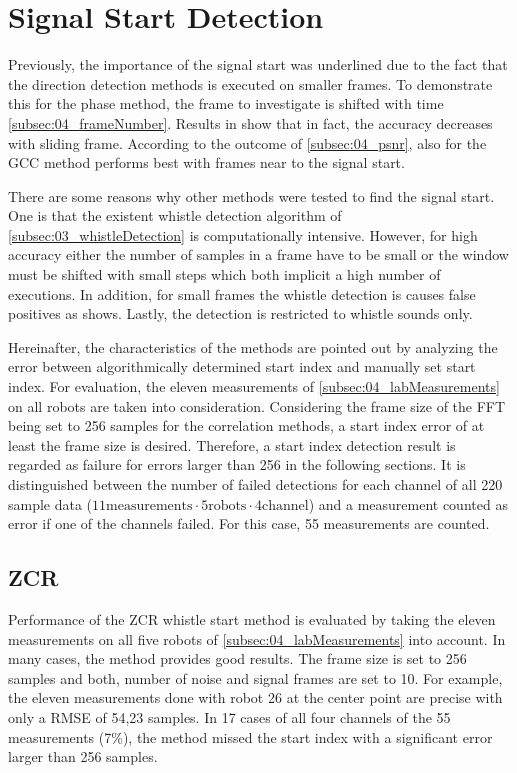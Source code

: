 \section{Signal Start Detection}
\label{sec:04_signalStartDetection}

Previously, the importance of the signal start was underlined
due to the fact that the direction detection methods is
executed on smaller frames.
To demonstrate this for the phase method, the frame to investigate is
shifted with time \cref{subsec:04_frameNumber}.
Results in show that in fact, the accuracy decreases with sliding frame.
According to the outcome of \cref{subsec:04_psnr}, also for the \ac{GCC}
method performs best with frames near to the signal start.

There are some reasons why other methods were tested to find the signal start.
One is that the existent whistle detection algorithm of \cref{subsec:03_whistleDetection}
is computationally intensive.
However, for high accuracy either the number of samples in a frame have to be
small or the window must be shifted with small steps which both implicit
a high number of executions.
In addition, for small frames the whistle detection is causes false positives
as \label{subsec:04_whistleDetection} shows.
Lastly, the detection is restricted to whistle sounds only.

Hereinafter, the characteristics of the methods are pointed out by
analyzing the error between algorithmically determined start index
and manually set start index.
For evaluation, the eleven measurements of \cref{subsec:04_labMeasurements}
on all robots are taken into consideration.
Considering the frame size of the \ac{FFT} being set to 256 samples for the
correlation methods, a start index error of at least the frame size is
desired.
Therefore, a start index detection result is regarded as failure for errors
larger than 256 in the following sections.
It is distinguished between the number of failed detections for each channel of
all 220 sample data ($11 \text{measurements} \cdot 5 \text{robots} \cdot 4 \text{channel}$)
and a measurement counted as error if one of the channels failed.
For this case, 55 measurements are counted.

\subsection{ZCR}
\label{subsec:04_zcr}

Performance of the \ac{ZCR} whistle start method is evaluated by taking the eleven
measurements on all five robots of \cref{subsec:04_labMeasurements} into account.
In many cases, the method provides good results.
The frame size is set to 256 samples and both, number of noise and signal frames
are set to 10.
For example, the eleven measurements done with robot 26 at the center point
are precise with only a \ac{RMSE} of 54,23 samples.
In 17 cases of all four channels of the 55 measurements (7\si{\percent}),
the method missed the start index with a significant error larger than 256 samples.

